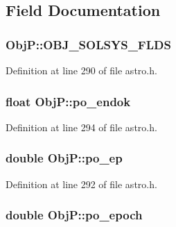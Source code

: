 \subsection{Field Documentation}
\hypertarget{struct_obj_p_a0968b8e2f9329181eeb4849d07237de3}{
\subsubsection[{O\-B\-J\-\_\-\-S\-O\-L\-S\-Y\-S\-\_\-\-F\-L\-D\-S}]{\setlength{\rightskip}{0pt plus 5cm}Obj\-P\-::\-O\-B\-J\-\_\-\-S\-O\-L\-S\-Y\-S\-\_\-\-F\-L\-D\-S}}\label{struct_obj_p_a0968b8e2f9329181eeb4849d07237de3}


Definition at line 290 of file astro.\-h.

\hypertarget{struct_obj_p_a2bbfd945a0f2200354061badc00fc3c4}{
\subsubsection[{po\-\_\-endok}]{\setlength{\rightskip}{0pt plus 5cm}float Obj\-P\-::po\-\_\-endok}}\label{struct_obj_p_a2bbfd945a0f2200354061badc00fc3c4}


Definition at line 294 of file astro.\-h.

\hypertarget{struct_obj_p_a1e907a569eee1486b305a03428790303}{
\subsubsection[{po\-\_\-ep}]{\setlength{\rightskip}{0pt plus 5cm}double Obj\-P\-::po\-\_\-ep}}\label{struct_obj_p_a1e907a569eee1486b305a03428790303}


Definition at line 292 of file astro.\-h.

\hypertarget{struct_obj_p_a6c13f08ad6241fab117ee292f9bbca95}{
\subsubsection[{po\-\_\-epoch}]{\setlength{\rightskip}{0pt plus 5cm}double Obj\-P\-::po\-\_\-epoch}}\label{struct_obj_p_a6c13f08ad6241fab117ee292f9bbca95}


